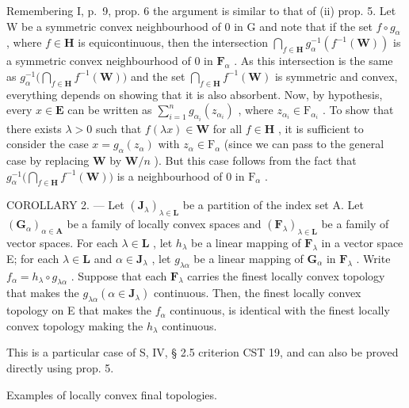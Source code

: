 Remembering I, p.~9, prop. 6 the argument is similar to that of (ii) prop. 5. Let W be a symmetric convex neighbourhood of 0 in G and note that if the set \(f \circ g_{\alpha}\) , where \(f \in \mathbf{H}\) is equicontinuous, then the intersection \(\bigcap_{f \in \mathbf{H}} g_{\alpha}^{-1}(f^{-1}(\mathbf{W}))\) is a symmetric convex neighbourhood of 0 in \(\mathbf{F}_{\alpha}\) . As this intersection is the same as \(g_{\alpha}^{-1}\big(\bigcap_{f \in \mathbf{H}} f^{-1}(\mathbf{W})\big)\) and the set \(\bigcap_{f \in \mathbf{H}} f^{-1}(\mathbf{W})\) is symmetric and convex, everything depends on showing that it is also absorbent. Now, by hypothesis, every \(x \in \mathbf{E}\) can be written as \(\sum_{i=1}^{n} g_{\alpha_i}(z_{\alpha_i})\) , where \(z_{\alpha_i} \in \mathrm{F}_{\alpha_i}\) . To show that there exists \(\lambda > 0\) such that \(f(\lambda x) \in \mathbf{W}\) for all \(f \in \mathbf{H}\) , it is sufficient to consider the case \(x = g_{\alpha}(z_{\alpha})\) with \(z_{\alpha} \in \mathrm{F}_{\alpha}\) (since we can pass to the general case by replacing \(\mathbf{W}\) by \(\mathbf{W}/n\) ). But this case follows from the fact that \(g_{\alpha}^{-1}\big(\bigcap_{f \in \mathbf{H}} f^{-1}(\mathbf{W})\big)\) is a neighbourhood of 0 in \(\mathrm{F}_{\alpha}\) .

COROLLARY 2. --- Let \((\mathbf{J}_{\lambda})_{\lambda \in \mathbf{L}}\) be a partition of the index set A. Let \((\mathbf{G}_{\alpha})_{\alpha \in \mathbf{A}}\) be a family of locally convex spaces and \((\mathbf{F}_{\lambda})_{\lambda \in \mathbf{L}}\) be a family of vector spaces. For each \(\lambda \in \mathbf{L}\) , let \(h_{\lambda}\) be a linear mapping of \(\mathbf{F}_{\lambda}\) in a vector space E; for each \(\lambda \in \mathbf{L}\) and \(\alpha \in \mathbf{J}_{\lambda}\) , let \(g_{\lambda \alpha}\) be a linear mapping of \(\mathbf{G}_{\alpha}\) in \(\mathbf{F}_{\lambda}\) . Write \(f_{\alpha} = h_{\lambda} \circ g_{\lambda \alpha}\) . Suppose that each \(\mathbf{F}_{\lambda}\) carries the finest locally convex topology that makes the \(g_{\lambda \alpha} (\alpha \in \mathbf{J}_{\lambda})\) continuous. Then, the finest locally convex topology on E that makes the \(f_{\alpha}\) continuous, is identical with the finest locally convex topology making the \(h_{\lambda}\) continuous.

This is a particular case of S, IV, § 2.5 criterion CST 19, and can also be proved directly using prop. 5.

Examples of locally convex final topologies.


